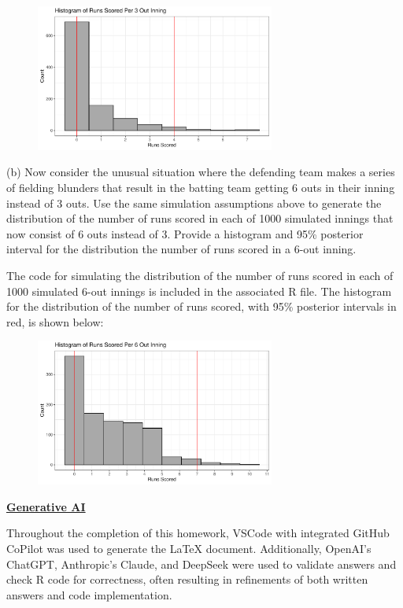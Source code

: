 \documentclass[12pt]{article}
\begin{document}
\begin{figure}[h]
    \centering
    \includegraphics[width=0.7\textwidth]{q8a_plot.pdf}
\end{figure}

(b) Now consider the unusual situation where the defending team makes a series of fielding blunders that result in the batting team getting 6 outs in their inning instead of 3 outs.  Use the same simulation assumptions above to generate the distribution of the number of runs scored in each of 1000 simulated innings that now consist of 6 outs instead of 3.   Provide a histogram and 95\% posterior interval for the distribution the number of runs scored in a 6-out inning.  

The code for simulating the distribution of the number of runs scored in each of 1000 simulated 6-out innings
is included in the associated R file. The histogram for the distribution of the number of runs scored,
with 95\% posterior intervals in red, is shown below:

\begin{figure}[h]
    \centering
    \includegraphics[width=0.7\textwidth]{q8b_plot.pdf}
\end{figure}

{\underline{\bf Generative AI}}  

Throughout the completion of this homework, VSCode with integrated GitHub CoPilot was used
to generate the LaTeX document. Additionally, OpenAI's ChatGPT, Anthropic's Claude, and DeepSeek were 
used to validate answers and check R code for correctness, often resulting in refinements of both written
answers and code implementation.
\end{document}
